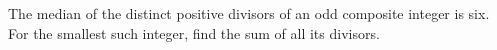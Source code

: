 The median of the distinct positive divisors of an odd composite integer is six. For the smallest such integer, find the sum of all its divisors.

